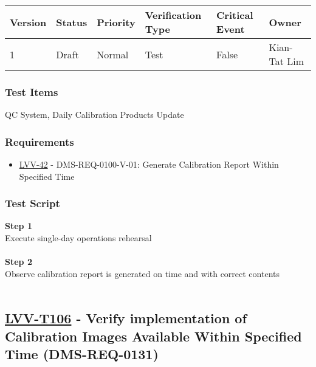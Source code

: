 \begin{longtable}[]{@{}llllll@{}}
\toprule
Version & Status & Priority & Verification Type & Critical Event &
Owner\tabularnewline
\midrule
\endhead
1 & Draft & Normal & Test & False & Kian-Tat Lim\tabularnewline
\bottomrule
\end{longtable}

\hypertarget{test-items-81}{%
\subsubsection{Test Items}\label{test-items-81}}

QC System, Daily Calibration Products Update

\hypertarget{requirements-82}{%
\subsubsection{Requirements}\label{requirements-82}}

\begin{itemize}
\tightlist
\item
  \href{https://jira.lsstcorp.org/browse/LVV-42}{LVV-42} -
  DMS-REQ-0100-V-01: Generate Calibration Report Within Specified Time
\end{itemize}

\hypertarget{test-script-82}{%
\subsubsection{Test Script}\label{test-script-82}}

\textbf{Step 1}\\
Execute single-day operations rehearsal\\
~\\
\textbf{Step 2}\\
Observe calibration report is generated on time and with correct
contents\\
~\\

\hypertarget{lvv-t106---verify-implementation-of-calibration-images-available-within-specified-time-dms-req-0131}{%
\subsection{\texorpdfstring{\href{https://jira.lsstcorp.org/secure/Tests.jspa\#/testCase/LVV-T106}{LVV-T106}
- Verify implementation of Calibration Images Available Within Specified
Time
(DMS-REQ-0131)}{LVV-T106 - Verify implementation of Calibration Images Available Within Specified Time (DMS-REQ-0131)}}\label{lvv-t106---verify-implementation-of-calibration-images-available-within-specified-time-dms-req-0131}}

